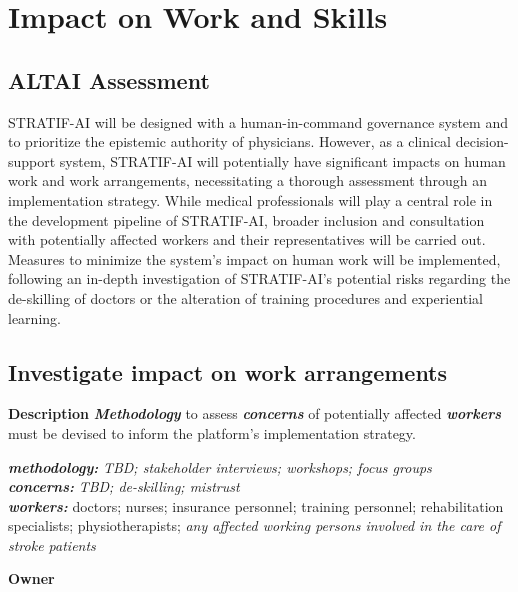 \documentclass[
  letterpaper,
  DIV=11,
  numbers=noendperiod]{scrreport}
\begin{document}
\hypertarget{impact-on-work-and-skills}{%
\section{Impact on Work and Skills}\label{impact-on-work-and-skills}}

\hypertarget{altai-assessment-14}{%
\subsection*{ALTAI Assessment}\label{altai-assessment-14}}

STRATIF-AI will be designed with a human-in-command governance system
and to prioritize the epistemic authority of physicians. However, as a
clinical decision-support system, STRATIF-AI will potentially have
significant impacts on human work and work arrangements, necessitating a
thorough assessment through an implementation strategy. While medical
professionals will play a central role in the development pipeline of
STRATIF-AI, broader inclusion and consultation with potentially affected
workers and their representatives will be carried out. Measures to
minimize the system's impact on human work will be implemented,
following an in-depth investigation of STRATIF-AI's potential risks
regarding the de-skilling of doctors or the alteration of training
procedures and experiential learning.

\hypertarget{investigate-impact-on-work-arrangements}{%
\subsection{Investigate impact on work
arrangements}\label{investigate-impact-on-work-arrangements}}

\textbf{Description} \textbf{\emph{Methodology}} to assess
\textbf{\emph{concerns}} of potentially affected \textbf{\emph{workers}}
must be devised to inform the platform's implementation strategy.

\textbf{\emph{methodology:}} \emph{TBD; stakeholder interviews;
workshops; focus groups}\\
\textbf{\emph{concerns:}} \emph{TBD; de-skilling; mistrust}\\
\textbf{\emph{workers:}} doctors; nurses; insurance personnel; training
personnel; rehabilitation specialists; physiotherapists; \emph{any
affected working persons involved in the care of stroke patients}

\textbf{Owner}
\end{document}
